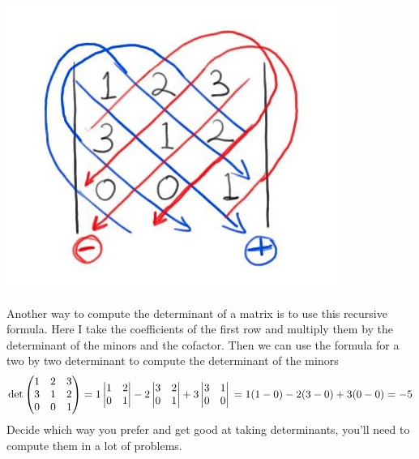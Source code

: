 {\begin{center}
\includegraphics[scale=.35]{determinant_3by3.jpg}
\end{center}


Another way to compute the determinant of a matrix is to use this recursive formula. Here I take the coefficients of the first row and multiply them by the determinant of the minors and the cofactor. Then we can use the formula for a two by two determinant to compute the determinant of the minors%
\[
\text{det}
\begin{pmatrix}
1 & 2 & 3 \\
3 & 1 & 2 \\
0 & 0 & 1 \\
\end{pmatrix}
= 1 
\begin{vmatrix}
1 & 2 \\
0 &1\\
\end{vmatrix} 
-2 
\begin{vmatrix}
3 & 2 \\
0 & 1 \\
\end{vmatrix} 
+ 3 
\begin{vmatrix}
3 & 1 \\
0 & 0 \\
\end{vmatrix}\\
 = 1(1-0) - 2(3-0) + 3(0-0) = -5
\]
Decide which way you prefer and get good at taking determinants, you'll need to compute them in a lot of problems.
}


